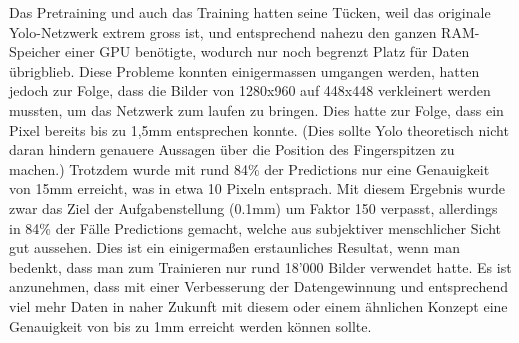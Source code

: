 Das Pretraining und auch das Training hatten seine Tücken, weil das originale Yolo-Netzwerk extrem gross ist, und entsprechend nahezu den ganzen RAM-Speicher einer GPU benötigte, wodurch nur noch begrenzt Platz für Daten übrigblieb. 
Diese Probleme konnten einigermassen umgangen werden, hatten jedoch zur Folge, dass die Bilder von 1280x960 auf 448x448 verkleinert werden mussten, um das Netzwerk zum laufen zu bringen. 
Dies hatte zur Folge, dass ein Pixel bereits bis zu 1,5mm entsprechen konnte. (Dies sollte Yolo theoretisch nicht daran hindern genauere Aussagen über die Position des Fingerspitzen zu machen.) 
Trotzdem wurde mit rund 84\% der Predictions nur eine Genauigkeit von 15mm erreicht, was in etwa 10 Pixeln entsprach. 
Mit diesem Ergebnis wurde zwar das Ziel der Aufgabenstellung (0.1mm) um Faktor 150 verpasst, allerdings in 84\% der Fälle Predictions gemacht, welche aus subjektiver menschlicher Sicht \grqq{}gut\grqq{} aussehen. 
Dies ist ein einigermaßen erstaunliches Resultat, wenn man bedenkt, dass man zum Trainieren nur rund 18'000 Bilder verwendet hatte. 
Es ist anzunehmen, dass mit einer Verbesserung der Datengewinnung und entsprechend viel mehr Daten in naher Zukunft mit diesem oder einem ähnlichen Konzept eine Genauigkeit von bis zu 1mm erreicht werden können sollte.
